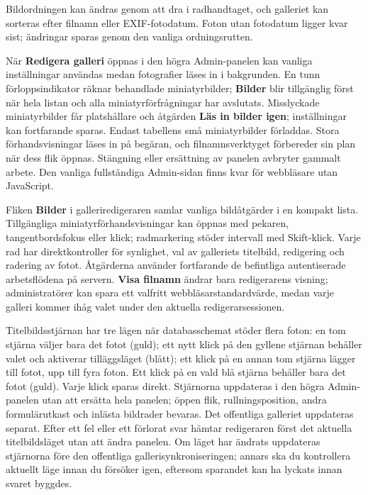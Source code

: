 \documentclass[11pt,a4paper]{article}
\newcommand{\ui}[1]{\textbf{#1}}
\begin{document}
Bildordningen kan ändras genom att dra i radhandtaget, och galleriet kan
sorteras efter filnamn eller EXIF-fotodatum. Foton utan fotodatum ligger kvar
sist; ändringar sparas genom den vanliga ordningsrutten.

När \ui{Redigera galleri} öppnas i den högra Admin-panelen kan vanliga
inställningar användas medan fotografier läses in i bakgrunden. En tunn
förloppsindikator räknar behandlade miniatyrbilder; \ui{Bilder} blir tillgänglig
först när hela listan och alla miniatyrförfrågningar har avslutats. Misslyckade
miniatyrbilder får platshållare och åtgärden \ui{Läs in bilder igen};
inställningar kan fortfarande sparas. Endast tabellens små miniatyrbilder
förladdas. Stora förhandsvisningar läses in på begäran, och filnamnsverktyget
förbereder sin plan när dess flik öppnas. Stängning eller ersättning av panelen
avbryter gammalt arbete. Den vanliga fullständiga Admin-sidan finns kvar för
webbläsare utan JavaScript.

Fliken \ui{Bilder} i galleriredigeraren samlar vanliga bildåtgärder i en kompakt
lista. Tillgängliga miniatyrförhandsvisningar kan öppnas med pekaren,
tangentbordsfokus eller klick; radmarkering stöder intervall med Skift-klick.
Varje rad har direktkontroller för synlighet, val av galleriets titelbild,
redigering och radering av fotot. Åtgärderna använder fortfarande de befintliga
autentiserade arbetsflödena på servern. \ui{Visa filnamn} ändrar bara
redigerarens visning; administratörer kan spara ett valfritt
webbläsarstandardvärde, medan varje galleri kommer ihåg valet under den aktuella
redigerarsessionen.

Titelbildsstjärnan har tre lägen när databasschemat stöder flera foton: en tom
stjärna väljer bara det fotot (guld); ett nytt klick på den gyllene stjärnan
behåller valet och aktiverar tilläggsläget (blått); ett klick på en annan tom
stjärna lägger till fotot, upp till fyra foton. Ett klick på en vald blå stjärna
behåller bara det fotot (guld). Varje klick sparas direkt. Stjärnorna uppdateras
i den högra Admin-panelen utan att ersätta hela panelen; öppen flik,
rullningsposition, andra formulärutkast och inlästa bildrader bevaras. Det
offentliga galleriet uppdateras separat. Efter ett fel eller ett förlorat svar
hämtar redigeraren först det aktuella titelbildsläget utan att ändra panelen. Om
läget har ändrats uppdateras stjärnorna före den offentliga
gallerisynkroniseringen; annars ska du kontrollera aktuellt läge innan du
försöker igen, eftersom sparandet kan ha lyckats innan svaret byggdes.
\end{document}
